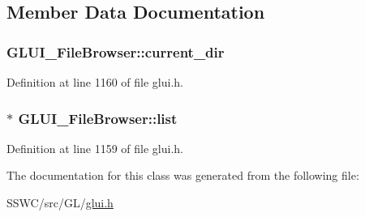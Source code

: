 \subsection{Member Data Documentation}
\hypertarget{class_g_l_u_i___file_browser_a91d9710c76d5a3cb3bc7486a627a86f3}{
\subsubsection[{current\+\_\+dir}]{ G\+L\+U\+I\+\_\+\+File\+Browser\+::current\+\_\+dir}}\label{class_g_l_u_i___file_browser_a91d9710c76d5a3cb3bc7486a627a86f3}


Definition at line 1160 of file glui.\+h.

\hypertarget{class_g_l_u_i___file_browser_a58ad435f622fdbff82775ca2313506c1}{
\subsubsection[{list}]{$\ast$ G\+L\+U\+I\+\_\+\+File\+Browser\+::list}}\label{class_g_l_u_i___file_browser_a58ad435f622fdbff82775ca2313506c1}


Definition at line 1159 of file glui.\+h.



The documentation for this class was generated from the following file\+:\begin{DoxyCompactItemize}
\item 
S\+S\+W\+C/src/\+G\+L/\hyperlink{glui_8h}{glui.\+h}\end{DoxyCompactItemize}
